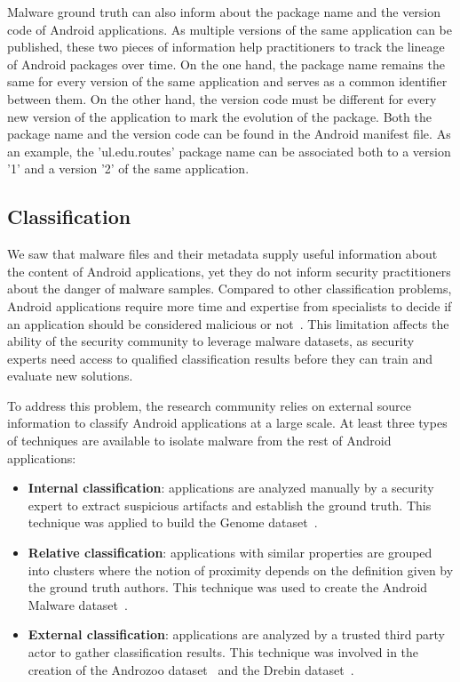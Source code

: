 Malware ground truth can also inform about the package name and the version code of Android applications.
As multiple versions of the same application can be published, these two pieces of information help practitioners to track the lineage of Android packages over time.
On the one hand, the package name remains the same for every version of the same application and serves as a common identifier between them.
On the other hand, the version code must be different for every new version of the application to mark the evolution of the package.
Both the package name and the version code can be found in the Android manifest file.
As an example, the 'ul.edu.routes' package name can be associated both to a version '1' and a version '2' of the same application.
\subsection{Classification}
We saw that malware files and their metadata supply useful information about the content of Android applications, yet they do not inform security practitioners about the danger of malware samples.
Compared to other classification problems, Android applications require more time and expertise from specialists to decide if an application should be considered malicious or not~\cite{ics2_cybersecurity_2018}.
This limitation affects the ability of the security community to leverage malware datasets, as security experts need access to qualified classification results before they can train and evaluate new solutions.

To address this problem, the research community relies on external source information to classify Android applications at a large scale.
At least three types of techniques are available to isolate malware from the rest of Android applications:

\begin{itemize}
  \item \textbf{Internal classification}: applications are analyzed manually by a security expert to extract suspicious artifacts and establish the ground truth. This technique was applied to build the Genome dataset~\cite{zhou_dissecting_2012}.
  \item \textbf{Relative classification}: applications with similar properties are grouped into clusters where the notion of proximity depends on the definition given by the ground truth authors. This technique was used to create the Android Malware dataset~\cite{wei_deep_2017}.
  \item \textbf{External classification}: applications are analyzed by a trusted third party actor to gather classification results. This technique was involved in the creation of the Androzoo dataset~\cite{allix_androzoo:_2016} and the Drebin dataset~\cite{arp_drebin:_2014}.
\end{itemize}

